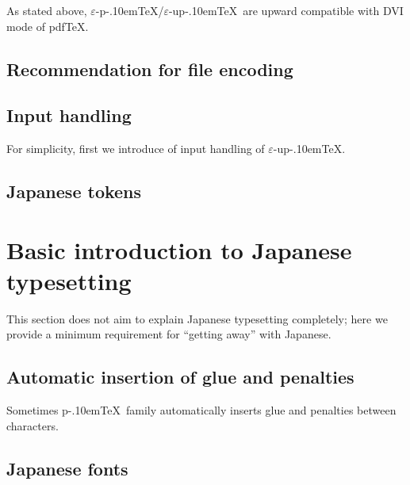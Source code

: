 \documentclass[a4paper,11pt]{article}
\let\emph=\origemph
\def\epTeX{$\varepsilon$-\pTeX}\def\eTeX{$\varepsilon$-\TeX}
\def\eupTeX{$\varepsilon$-\upTeX}\def\upTeX{u\pTeX}
\def\pTeX{p\kern-.10em\TeX}
\def\pdfTeX{pdf\TeX}
\begin{document}
As stated above,
\epTeX/\eupTeX\ are \emph{not} upward compatible with DVI mode of \pdfTeX.


\subsection{Recommendation for file encoding}


\subsection{Input handling}

For simplicity, first we introduce of input handling of \eupTeX.


\subsection{Japanese tokens}

\section{Basic introduction to Japanese typesetting}

This section does not aim to explain Japanese typesetting completely;
here we provide a minimum requirement for ``getting away'' with Japanese.

\subsection{Automatic insertion of glue and penalties}

Sometimes \pTeX\ family automatically inserts glue and penalties
between characters.

\subsection{Japanese fonts}
\end{document}
